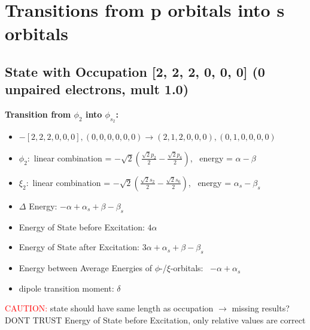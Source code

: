 \documentclass[12pt,a4paper]{article}
\begin{document}
\newpage \section*{Transitions from p orbitals into s orbitals}\subsection*{State with Occupation [2, 2, 2, 0, 0, 0] (0 unpaired electrons, mult 1.0)}
        \noindent\textbf{Transition from $\phi_{2}$ into $\phi_{s_{2}}$:}
        \begin{itemize}
            \item $- [2, 2, 2, 0, 0, 0], (0, 0, 0, 0, 0, 0) \rightarrow (2, 1, 2, 0, 0, 0), (0, 1, 0, 0, 0, 0)$
        
            \item $\phi_{2}:$ linear combination = $- \sqrt{2} \left(\frac{\sqrt{2} p_{2}}{2} - \frac{\sqrt{2} p_{6}}{2}\right)$, \
            energy = $\alpha - \beta$
            
            \item $\xi_{2}:$ linear combination = $- \sqrt{2} \left(\frac{\sqrt{2} s_{2}}{2} - \frac{\sqrt{2} s_{6}}{2}\right)$, \
            energy = $\alpha_{s} - \beta_{s}$
            
            \item $\Delta$ Energy: $- \alpha + \alpha_{s} + \beta - \beta_{s}$
            \item Energy of State before Excitation: $4 \alpha$
            \item Energy of State after Excitation: $3 \alpha + \alpha_{s} + \beta - \beta_{s}$
            \item Energy between Average Energies of $\phi$-/$\xi$-orbitals: \
            $- \alpha + \alpha_{s}$
        
            \item dipole transition moment: $\delta$
        
        \end{itemize}
        
	\textcolor{red}{CAUTION:} state should have same length as occupation $\rightarrow$ missing results?
	DONT TRUST \glqq{}Energy of State before Excitation\grqq{}, only relative values are correct
\end{document}
